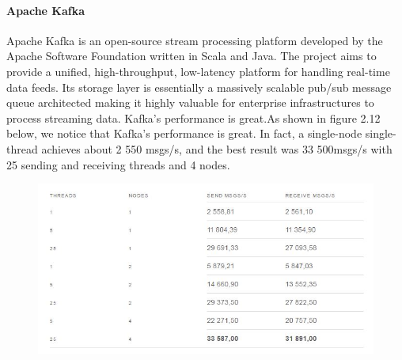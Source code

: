 \paragraph{Apache Kafka}
\label{sec:sec01}
Apache Kafka is an open-source stream processing platform developed by the Apache Software Foundation 
written in Scala and Java. The project aims to provide a unified, high-throughput, low-latency platform for handling 
real-time data feeds. Its storage layer is essentially a massively scalable pub/sub message queue 
architected making it highly valuable for enterprise infrastructures to process streaming data.
Kafka's performance is great.As shown in figure 2.12 below, we notice that Kafka’s performance is great. In fact, a single-node single-thread achieves about 2 550 msgs/s, and the best result was 33 500msgs/s with 25 sending and receiving threads and 4 nodes.
\begin{figure}[h!]
	\centering
	\includegraphics[height=0.3\textheight]{fig01/kafkaPerformance}
	\label{fig:FilialesEtClients}
\end{figure}

